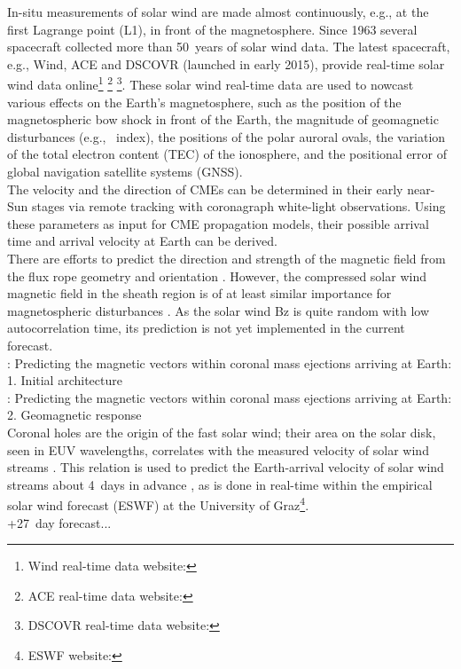 In-situ measurements of solar wind are made almost continuously, e.g., at the first Lagrange point (L1), in front of the magnetosphere. Since 1963 several spacecraft collected more than 50~years of solar wind data. The latest spacecraft, e.g., Wind, ACE and DSCOVR (launched in early 2015), provide real-time solar wind data online\footnote{Wind real-time data website: } \footnote{ACE real-time data website: } \footnote{DSCOVR real-time data website: }.
These solar wind real-time data are used to nowcast various effects on the Earth's magnetosphere, such as the position of the magnetospheric bow shock in front of the Earth, the magnitude of geomagnetic disturbances (e.g., \Kp~index), the positions of the polar auroral ovals, the variation of the total electron content (TEC) of the ionosphere, and the positional error of global navigation satellite systems (GNSS).\\


The velocity and the direction of CMEs can be determined in their early near-Sun stages via remote tracking with coronagraph white-light observations. Using these parameters as input for CME propagation models, their possible arrival time and arrival velocity at Earth can be derived.\\

There are efforts to predict the direction and strength of the magnetic field from the flux rope geometry and orientation \citep{Savani2015}. However, the compressed solar wind magnetic field in the sheath region is of at least similar importance for magnetospheric disturbances \citep{Huttunen2004}. As the solar wind Bz is quite random with low autocorrelation time, its prediction is not yet implemented in the current forecast.\\

\citet{Savani2015}: Predicting the magnetic vectors within coronal mass ejections arriving at Earth: 1. Initial architecture\\
\citet{Savani2017}: Predicting the magnetic vectors within coronal mass ejections arriving at Earth: 2. Geomagnetic response\\

Coronal holes are the origin of the fast solar wind; their area on the solar disk, seen in EUV wavelengths, correlates with the measured velocity of solar wind streams \citep{Vrsnak2007}. This relation is used to predict the Earth-arrival velocity of solar wind streams about 4~days in advance \citep{Rotter2012}, as is done in real-time within the empirical solar wind forecast (ESWF) at the University of Graz\footnote{ESWF website: }.\\
+27~day forecast...\\

